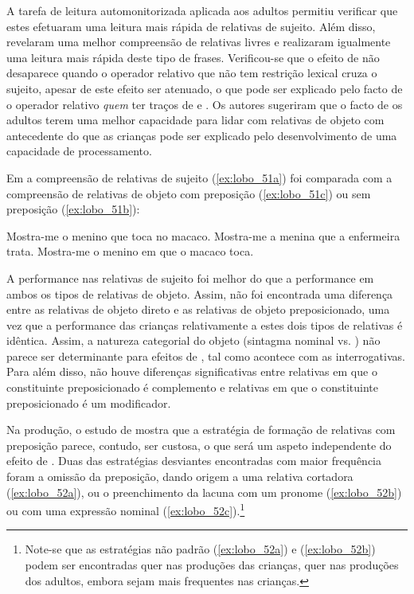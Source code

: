 \documentclass[output=paper]{LSP/langsci}
\begin{document}
A tarefa de leitura automonitorizada aplicada aos adultos permitiu verificar que estes efetuaram uma leitura mais rápida de relativas de sujeito. Além disso, revelaram uma melhor compreensão de relativas livres e realizaram igualmente uma leitura mais rápida deste tipo de frases. Verificou-se que o efeito de  não desaparece quando o operador relativo que não tem restrição lexical cruza o sujeito, apesar de este efeito ser atenuado, o que pode ser explicado pelo facto de o operador relativo \textit{quem} ter traços de  e . Os autores sugeriram que o facto de os adultos terem uma melhor capacidade para lidar com relativas de objeto com antecedente do que as crianças pode ser explicado pelo desenvolvimento de uma capacidade de processamento.\largerpage[2]

Em \citet{costa_etal2014,costa_etal2013} a compreensão de relativas de sujeito (\ref{ex:lobo_51a}) foi comparada com a compreensão de relativas de objeto com preposição (\ref{ex:lobo_51c}) ou sem preposição (\ref{ex:lobo_51b}):

\ea\label{ex:lobo_51}
\ea\label{ex:lobo_51a} Mostra-me o menino que toca no macaco.
\ex\label{ex:lobo_51b} Mostra-me a menina que a enfermeira trata.
\ex\label{ex:lobo_51c} Mostra-me o menino em que o macaco toca.
\zl

A performance nas relativas de sujeito foi melhor do que a performance em ambos os tipos de relativas de objeto. Assim, não foi encontrada uma diferença entre as relativas de objeto direto e as relativas de objeto preposicionado, uma vez que a performance das crianças relativamente a estes dois tipos de relativas é idêntica. Assim, a natureza categorial do objeto (sintagma nominal vs. ) não parece ser determinante para efeitos de , tal como acontece com as interrogativas. Para além disso, não houve diferenças significativas entre relativas em que o constituinte preposicionado é complemento e relativas em que o constituinte preposicionado é um modificador.


Na produção, o estudo de \citet{costasilva2014} mostra que a estratégia de formação de relativas com preposição parece, contudo, ser custosa, o que será um aspeto independente do efeito de . Duas das estratégias desviantes encontradas com maior frequência foram a omissão da preposição, dando origem a uma relativa cortadora (\ref{ex:lobo_52a}), ou o preenchimento da lacuna com um pronome (\ref{ex:lobo_52b}) ou com uma expressão nominal (\ref{ex:lobo_52c}).\footnote{Note-se que as estratégias não padrão (\ref{ex:lobo_52a}) e (\ref{ex:lobo_52b}) podem ser encontradas quer nas produções das crianças, quer nas produções dos adultos, embora sejam mais frequentes nas crianças.}
\end{document}
